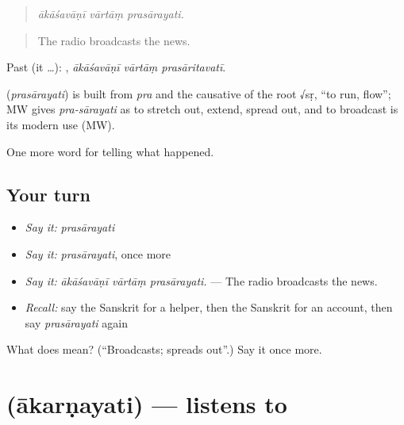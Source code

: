 \begin{quote}
  
\end{quote}

\begin{quote}
\emph{ākāśavāṇī vārtāṃ prasārayati.}
\end{quote}

\begin{quote}
The radio broadcasts the news.
\end{quote}

Past (it …):   , \emph{ākāśavāṇī vārtāṃ prasāritavatī}.

\begin{cousinweb}
\textbf{} (\emph{prasārayati}) is built from \emph{pra} and the causative of the root √sṛ, \textquotedblleft{}to run, flow\textquotedblright{}; MW gives \emph{pra-sārayati} as to stretch out, extend, spread out, and to broadcast is its modern use (MW).
\end{cousinweb}

\begin{grammarlens}[title={What you've built}]
One more word for telling what happened.
\end{grammarlens}

\subsection*{Your turn}
\begin{itemize}
\raggedright
  \item \emph{Say it:} \emph{prasārayati}
  \item \emph{Say it:} \emph{prasārayati}, once more
  \item \emph{Say it:} \emph{ākāśavāṇī vārtāṃ prasārayati.} — The radio broadcasts the news.
  \item \emph{Recall:} say the Sanskrit for a helper, then the Sanskrit for an account, then say \emph{prasārayati} again
\end{itemize}

\begin{tcolorbox}[breakable,colback=teal!4,colframe=teal!35!black,title={Before you move on}]
What does  mean? (\textquotedblleft{}Broadcasts; spreads out\textquotedblright{}.) Say it once more.
\end{tcolorbox}
\section[\texorpdfstring{\sk{आकर्णयति} (ākarṇayati)}{आकर्णयति (ākarṇayati)}]{ (ākarṇayati) — listens to}

